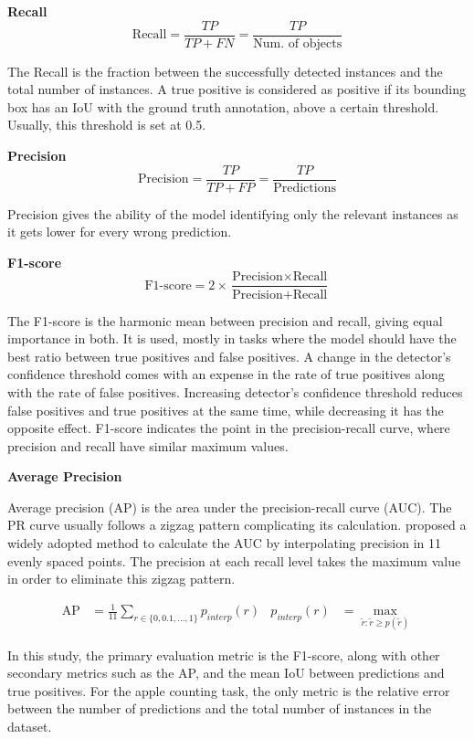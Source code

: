 \bigskip
\textbf{Recall}
\bigskip\noindent
\begin{equation}
  \text{Recall} = \frac{TP}{TP+FN}=\frac{TP}{\text{Num. of objects}}
\end{equation} 

The Recall is the fraction between the successfully detected instances and the total number of instances. A true positive is considered as positive if its bounding box has an IoU with the ground truth annotation, above a certain threshold. Usually, this threshold is set at 0.5.

\bigskip
\textbf{Precision}
\bigskip\noindent
\begin{equation}
  \text{Precision} = \frac{TP}{TP+FP}=\frac{TP}{\text{Predictions}}
\end{equation} 

Precision gives the ability of the model identifying only the relevant instances as it gets lower for every wrong prediction.

\bigskip
\textbf{F1-score}
\bigskip\noindent
\begin{equation}
  \text{F1-score} = 2\times\frac{\text{Precision}\times \text{Recall}}{\text{Precision}+\text{Recall}}\end{equation} 
  
The F1-score is the harmonic mean between precision and recall, giving equal importance in both. It is used, mostly in tasks where the model should have the best ratio between true positives and false positives. A change in the detector's confidence threshold comes with an expense in the rate of true positives along with the rate of false positives. Increasing detector's confidence threshold reduces false positives and true positives at the same time, while decreasing it has the opposite effect. F1-score indicates the point in the precision-recall curve, where precision and recall have similar maximum values.

\bigskip
\textbf{Average Precision}
\bigskip\noindent

Average precision (AP) is the area under the precision-recall curve (AUC). The PR curve usually follows a zigzag pattern complicating its calculation. \cite{everingham2010pascal} proposed a widely adopted method to calculate the AUC by interpolating precision in 11 evenly spaced points. The precision at each recall level takes the maximum value in order to eliminate this zigzag pattern.

\begin{align}
  \text{AP} &= \frac{1}{11}\sum_{r\in\{0,0.1,...,1\}}p_{interp}(r)	&	p_{interp}(r) &= \max_{\tilde{r}:\tilde{r}\geq p(\tilde{r})}
\end{align} 

In this study, the primary evaluation metric is the F1-score, along with other secondary metrics such as the AP, and the mean IoU between predictions and true positives. For the apple counting task, the only metric is the relative error between the number of predictions and the total number of instances in the dataset.